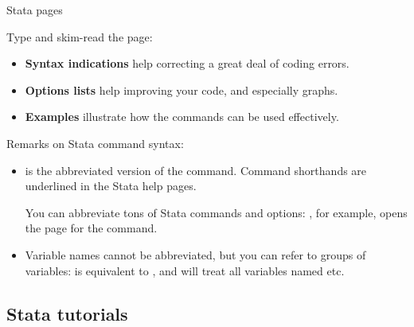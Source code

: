 \documentclass{beamer}
\begin{document}
	\begin{frame}[t]{Stata  pages}

		Type  and skim-read the page:

		\begin{itemize}
			\item \textbf{Syntax indications} help correcting a great deal of coding errors.
			\item \textbf{Options lists} help improving your code, and especially graphs.
			\item \textbf{Examples} illustrate how the commands can be used effectively.
		\end{itemize}
		
		Remarks on Stata command syntax:
		
		\begin{itemize}
			\item {} is the abbreviated version of the  command. Command shorthands are underlined in the Stata help pages.
		
		You can abbreviate tons of Stata commands and options: , for example, opens the  page for the  command.
		
			\item Variable names cannot be abbreviated, but you can refer to groups of variables:  is equivalent to , and  will treat all variables named  etc.
		\end{itemize}

	\end{frame}

	\subsection{Stata tutorials}
\end{document}
